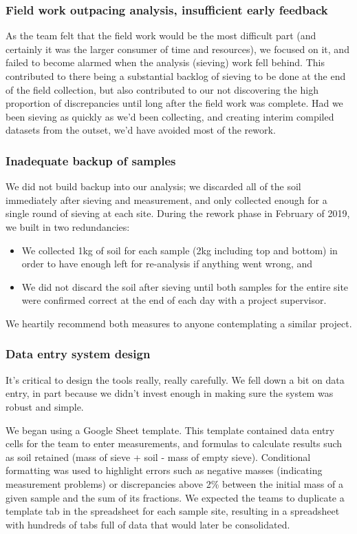 \documentclass[a4paper,12pt]{article}
\begin{document}
  
\subsubsection{Field work outpacing analysis, insufficient early feedback}
As the team felt that the field work would be the most difficult part (and certainly it was the larger consumer of time and resources), we focused on it, and failed to become alarmed when the analysis (sieving) work fell behind. This contributed to there being a substantial backlog of sieving to be done at the end of the field collection, but also contributed to our not discovering the high proportion of discrepancies until long after the field work was complete. Had we been sieving as quickly as we'd been collecting, and creating interim compiled datasets from the outset, we'd have avoided most of the rework.

\subsubsection{Inadequate backup of samples}
We did not build backup into our analysis; we discarded all of the soil immediately after sieving and measurement, and only collected enough for a single round of sieving at each site. During the rework phase in February of 2019, we built in two redundancies:

\begin{itemize}
  \item We collected 1kg of soil for each sample (2kg including top and bottom) in order to have enough left for re-analysis if anything went wrong, and
  \item We did not discard the soil after sieving until both samples for the entire site were confirmed correct at the end of each day with a project supervisor.
\end{itemize}

We heartily recommend both measures to anyone contemplating a similar project.

\subsubsection{Data entry system design}
It's critical to design the tools really, really carefully. We fell down a bit on data entry, in part because we didn't invest enough in making sure the system was robust and simple.

We began using a Google Sheet template. This template contained data entry cells for the team to enter measurements, and formulas to calculate results such as soil retained (mass of sieve + soil - mass of empty sieve). Conditional formatting was used to highlight errors such as negative masses (indicating measurement problems) or discrepancies above 2\% between the initial mass of a given sample and the sum of its fractions. We expected the teams to duplicate a template tab in the spreadsheet for each sample site, resulting in a spreadsheet with hundreds of tabs full of data that would later be consolidated.
\end{document}
